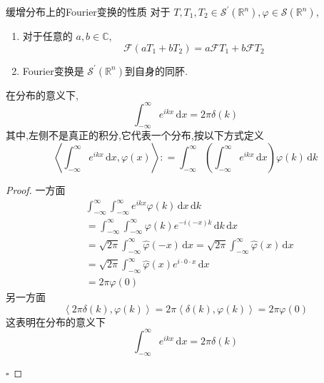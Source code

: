 \documentclass[../../main.tex]{subfiles}
\begin{document}
\begin{theorem}{缓增分布上的Fourier变换的性质}
    对于 \(  T,T_1,T_2\in \mathcal{S}^{\prime} \left( \mathbb{R} ^{n} \right), \varphi \in \mathcal{S}\left( \mathbb{R} ^{n} \right)    \),
    \begin{enumerate}
        \item 对于任意的 \(  a,b\in \mathbb{C}   \), \[
        \mathcal{F}\left( aT_1+ bT_2 \right)= a \mathcal{F}T_1+  b \mathcal{F}T_2 
        \]
        \item Fourier变换是 \(  \mathcal{S}^{\prime} \left( \mathbb{R} ^{n} \right)   \)到自身的同肧. 
    \end{enumerate}
     
\end{theorem}


\begin{proposition}
    在分布的意义下,\[
    \int_{-\infty}^{\infty}e^{ikx}\,\mathrm{d} x= 2\pi  \delta \left( k \right) 
    \]其中,左侧不是真正的积分,它代表一个分布,按以下方式定义 \[
    \left<\int_{-\infty}^{\infty}e^{ikx}\,\mathrm{d} x, \varphi \left( x \right)  \right>: =  \int_{-\infty}^{\infty} \left( \int_{-\infty}^{\infty}e^{ikx}\,\mathrm{d} x \right) \varphi \left( k \right)\,\mathrm{d} k  
    \]
\end{proposition}
\begin{proof}
     一方面\[
    \begin{aligned}
    & \int_{-\infty}^{\infty}\int_{-\infty}^{\infty}e^{ikx}  \varphi \left( k \right)\,\mathrm{d} x\,\mathrm{d} k\\ 
     &=  \int_{-\infty}^{\infty} \int_{-\infty}^{\infty}  \varphi \left( k \right)e^{-i\left( -x \right)k } \,\mathrm{d} k\,\mathrm{d} x\\ 
      &= \sqrt{2\pi } \int_{-\infty}^{\infty} \hat{\varphi}\left( -x \right)\,\mathrm{d} x =\sqrt{2\pi } \int_{-\infty}^{\infty} \hat{\varphi}\left( x \right)\,\mathrm{d} x \\ 
       &= \sqrt{2\pi } \int_{-\infty}^{\infty} \hat{\varphi}\left( x \right) e^{i\cdot 0\cdot x}\,\mathrm{d} x\\ 
        &= 2\pi  \varphi \left( 0 \right) 
    \end{aligned} 
     \]另一方面 \[
     \left<2\pi  \delta \left( k \right), \varphi \left( k\right)   \right>= 2\pi \left< \delta \left( k \right), \varphi \left( k \right)   \right>= 2\pi  \varphi \left( 0 \right) 
     \]这表明在分布的意义下 \[
     \int_{-\infty}^{\infty}e^{ikx}\,\mathrm{d} x= 2\pi  \delta \left( k \right) 
     \]

    \hfill $\square$
\end{proof}
\end{document}
